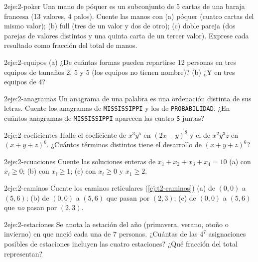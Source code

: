 \begin{ejercicio}{2}{eje:2-poker}
Una mano de póquer es un subconjunto de 5 cartas de una baraja francesa (13 valores, 4 palos). Cuente las manos con (a) póquer (cuatro cartas del mismo valor); (b) full (tres de un valor y dos de otro); (c) doble pareja (dos parejas de valores distintos y una quinta carta de un tercer valor). Exprese cada resultado como fracción del total de manos.
\end{ejercicio}

\begin{ejercicio}{2}{eje:2-equipos}
(a) ¿De cuántas formas pueden repartirse 12 personas en tres equipos de tamaños 2, 5 y 5 (los equipos no tienen nombre)? (b) ¿Y en tres equipos de 4?
\end{ejercicio}

\begin{ejercicio}{2}{eje:2-anagramas}
Un anagrama de una palabra es una ordenación distinta de sus letras. Cuente los anagramas de \texttt{MISSISSIPPI} y los de \texttt{PROBABILIDAD}. ¿En cuántos anagramas de \texttt{MISSISSIPPI} aparecen las cuatro \texttt{S} juntas?
\end{ejercicio}

\begin{ejercicio}{2}{eje:2-coeficientes}
Halle el coeficiente de $x^{3}y^{5}$ en $(2x-y)^{8}$ y el de $x^{2}y^{3}z$ en $(x+y+z)^{6}$. ¿Cuántos términos distintos tiene el desarrollo de $(x+y+z)^{6}$?
\end{ejercicio}

\begin{ejercicio}{2}{eje:2-ecuaciones}
Cuente las soluciones enteras de $x_1+x_2+x_3+x_4=10$ (a) con $x_i\ge0$; (b) con $x_i\ge1$; (c) con $x_i\ge0$ y $x_1\ge2$.
\end{ejercicio}

\begin{ejercicio}{2}{eje:2-caminos}
Cuente los caminos reticulares (\cref{ej:t2-caminos}) (a) de $(0,0)$ a $(5,6)$; (b) de $(0,0)$ a $(5,6)$ que pasan por $(2,3)$; (c) de $(0,0)$ a $(5,6)$ que \emph{no} pasan por $(2,3)$.
\end{ejercicio}

\begin{ejercicio}{2}{eje:2-estaciones}
Se anota la estación del año (primavera, verano, otoño o invierno) en que nació cada una de 7 personas. ¿Cuántas de las $4^{7}$ asignaciones posibles de estaciones incluyen las cuatro estaciones? ¿Qué fracción del total representan?
\end{ejercicio}

